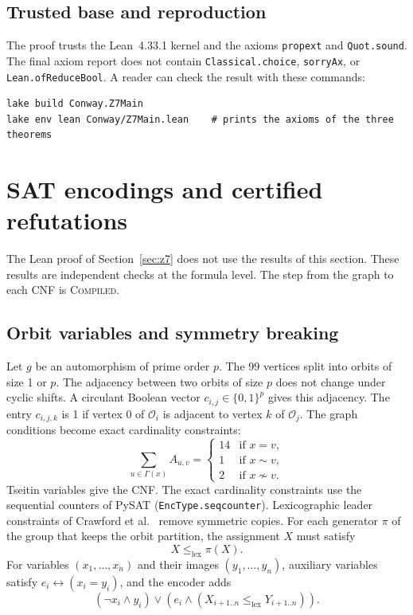 \documentclass[pdflatex,sn-mathphys-num]{sn-jnl}
\theoremstyle{thmstyleone}
\theoremstyle{thmstyletwo}
\theoremstyle{thmstylethree}
\numberwithin{equation}{section}
\begin{document}
\subsection{Trusted base and reproduction}

The proof trusts the Lean~4.33.1 kernel and the axioms \texttt{propext} and \texttt{Quot.sound}. The final axiom report does not contain \texttt{Classical.choice}, \texttt{sorryAx}, or \texttt{Lean.ofReduceBool}. A reader can check the result with these commands:
\begin{lstlisting}
lake build Conway.Z7Main
lake env lean Conway/Z7Main.lean    # prints the axioms of the three theorems
\end{lstlisting}

\section{SAT encodings and certified refutations}
\label{sec:sat}

The Lean proof of Section~\ref{sec:z7} does not use the results of this section. These results are independent checks at the formula level. The step from the graph to each CNF is \textsc{Compiled}.

\subsection{Orbit variables and symmetry breaking}

Let $g$ be an automorphism of prime order $p$. The 99 vertices split into orbits of size 1 or $p$. The adjacency between two orbits of size $p$ does not change under cyclic shifts. A circulant Boolean vector $c_{i,j} \in \{0,1\}^p$ gives this adjacency. The entry $c_{i,j,k}$ is 1 if vertex 0 of $\mathcal{O}_i$ is adjacent to vertex $k$ of $\mathcal{O}_j$.
The graph conditions become exact cardinality constraints:
\begin{equation}
 \sum_{u \in \Gamma(x)} A_{u,v} =
 \begin{cases}
  14 & \text{if } x = v, \\
  1 & \text{if } x \sim v, \\
  2 & \text{if } x \not\sim v.
 \end{cases}
\end{equation}
Tseitin variables give the CNF. The exact cardinality constraints use the sequential counters of PySAT (\texttt{EncType.seqcounter}).
Lexicographic leader constraints of Crawford et al.~\cite{crawford1996symmetry} remove symmetric copies. For each generator $\pi$ of the group that keeps the orbit partition, the assignment $X$ must satisfy
\begin{equation}
 X \le_{\text{lex}} \pi(X).
 \label{eq:lex_leader}
\end{equation}
For variables $(x_1, \dots, x_n)$ and their images $(y_1, \dots, y_n)$, auxiliary variables satisfy $e_i \leftrightarrow (x_i = y_i)$, and the encoder adds
\begin{equation}
 (\neg x_i \land y_i) \lor (e_i \land (X_{i+1..n} \le_{\text{lex}} Y_{i+1..n})).
\end{equation}
\end{document}
